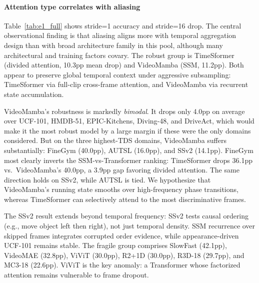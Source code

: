 \documentclass[a4paper, 10pt, conference]{ieeeconf}
\newcommand{\TDS}{\textsc{TDS}}
\begin{document}
\paragraph{Attention type correlates with aliasing}
Table~\ref{tab:e1_full} shows stride=1 accuracy and stride=16 drop. The central observational finding is that aliasing aligns more with temporal aggregation design than with broad architecture family in this pool, although many architectural and training factors covary. The robust group is TimeSformer (divided attention, 10.3pp mean drop) and VideoMamba (SSM, 11.2pp). Both appear to preserve global temporal context under aggressive subsampling: TimeSformer via full-clip cross-frame attention, and VideoMamba via recurrent state accumulation.

VideoMamba's robustness is markedly \emph{bimodal}. It drops only 4.0pp on average over UCF-101, HMDB-51, EPIC-Kitchens, Diving-48, and DriveAct, which would make it the most robust model by a large margin if these were the only domains considered. But on the three highest-\TDS{} domains, VideoMamba suffers substantially: FineGym (40.0pp), AUTSL (16.0pp), and SSv2 (14.1pp). FineGym most clearly inverts the SSM-vs-Transformer ranking: TimeSformer drops 36.1pp vs.\ VideoMamba's 40.0pp, a 3.9pp gap favoring divided attention. The same direction holds on SSv2, while AUTSL is tied. We hypothesize that VideoMamba's running state smooths over high-frequency phase transitions, whereas TimeSformer can selectively attend to the most discriminative frames.

The SSv2 result extends beyond temporal frequency: SSv2 tests causal ordering (e.g., move object left then right), not just temporal density. SSM recurrence over skipped frames integrates corrupted order evidence, while appearance-driven UCF-101 remains stable. The fragile group comprises SlowFast (42.1pp), VideoMAE (32.8pp), ViViT (30.0pp), R2+1D (30.0pp), R3D-18 (29.7pp), and MC3-18 (22.6pp). ViViT is the key anomaly: a Transformer whose factorized attention remains vulnerable to frame dropout.
\end{document}
